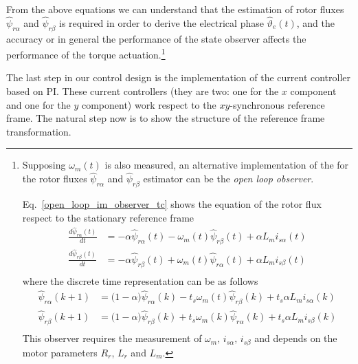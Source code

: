 \documentclass[11pt,a4paper,oneside]{book}
\numberwithin{equation}{section}
\theoremstyle{it}
\theoremstyle{definition}
\begin{document}
From the above equations we can understand that the estimation of rotor fluxes 
$\hat{\psi}_{r\alpha}$ and $\hat{\psi}_{r\beta}$ is required in order to derive 
the electrical phase $\hat{\vartheta}_{e}(t)$, and the accuracy or in general 
the performance of the state observer affects the performance of the torque 
actuation.\footnote{
	Supposing $\omega_m(t)$ is also measured, an alternative implementation of the  
	for the rotor fluxes $\hat{\psi}_{r\alpha}$ and 
	$\hat{\psi}_{r\beta}$ estimator can be the \textit{open loop observer}. 
	
	Eq.~\eqref{open_loop_im_observer_tc} shows the equation of the rotor flux 
	respect to the stationary reference frame
	\begin{equation}\label{open_loop_im_observer_tc}
		\begin{aligned}
			\frac{d\hat{\psi}_{r\alpha}(t)}{dt} &= -\alpha \hat{\psi}_{r\alpha}(t) 
			-\omega_m(t)\hat{\psi}_{r\beta}(t) + \alpha L_m i_{s\alpha}(t) \\[6pt]
			\frac{d\hat{\psi}_{r\beta}(t)}{dt} &= -\alpha \hat{\psi}_{r\beta}(t) 
			+\omega_m(t)\hat{\psi}_{r\alpha}(t) + \alpha L_m i_{s\beta}(t) \\[6pt]
		\end{aligned}
	\end{equation}
	where the discrete time representation can be as follows
	\begin{equation}\label{open_loop_im_observer_td}
		\begin{aligned}
			\hat{\psi}_{r\alpha}(k+1) &= \Big(1-\alpha\Big) \hat{\psi}_{r\alpha}(k) 
			-t_s\omega_m(t)\hat{\psi}_{r\beta}(k) + t_s\alpha L_m i_{s\alpha}(k) \\[6pt]
			\hat{\psi}_{r\beta}(k+1) &= \Big(1-\alpha\Big) \hat{\psi}_{r\beta}(k) 
			+t_s\omega_m(k)\hat{\psi}_{r\alpha}(k) + t_s\alpha L_m i_{s\beta}(k) \\[6pt]
		\end{aligned}
	\end{equation}
	This observer requires the measurement of $\omega_m,\, i_{s\alpha},\, 
	i_{s\beta}$ and depends on the motor parameters $R_r$, $L_r$ and $L_m$.}

The last step in our control design is the implementation of the current controller based on PI. These current controllers (they are two: one for the $x$ component and one for the $y$ component) work respect to the $xy$-synchronous reference frame. The natural step now is to show the structure of the reference frame transformation.
\end{document}
